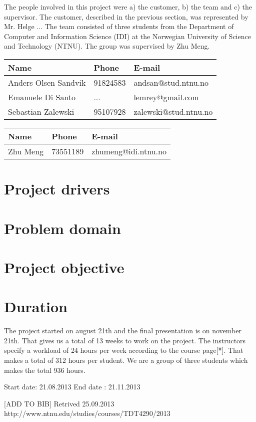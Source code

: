 The people involved in this project were a) the customer, b) the team and c) the supervisor.
The customer, described in the previous section, was represented by Mr. Helge ...
The team consisted of three students from the Department of Computer and Information Science (IDI) at the Norwegian University of Science and Technology (NTNU). The group was supervised by Zhu Meng.

\begin{center}
\begin{tabular}{ l | l | l }
  \hline
  Name & Phone & E-mail \\
  \hline\noalign{\smallskip}\noalign{\smallskip}\hline
  Anders Olsen Sandvik	& 91824583 & andsan@stud.ntnu.no \\
  Emanuele Di Santo		& ... & lemrey@gmail.com \\
  Sebastian Zalewski	& 95107928 & zalewski@stud.ntnu.no \\
  \hline
\end{tabular}
\end{center}

\begin{center}
\begin{tabular}{ l | l | l }
  \hline
  Name & Phone & E-mail \\
  \hline\noalign{\smallskip}\noalign{\smallskip}\hline
  Zhu Meng	& 73551189 & zhumeng@idi.ntnu.no \\
  \hline
\end{tabular}
\end{center}


\section{Project drivers}

\section{Problem domain}

\section{Project objective}

\section{Duration}
The project started on august 21th and the final presentation is on november 21th. That gives us a total of 13 weeks to work on the project. The instructors specify a workload of 24 hours per week according to the course page[*]. That makes a total of 312 hours per student. We are a group of three students which makes the total 936 hours.

Start date: 21.08.2013
End date : 21.11.2013

[ADD TO BIB] Retrived 25.09.2013 http://www.ntnu.edu/studies/courses/TDT4290/2013